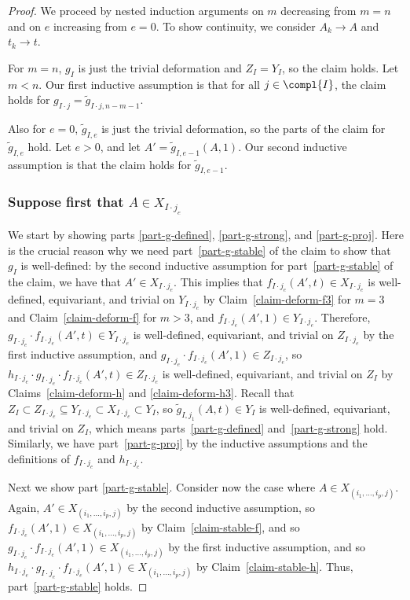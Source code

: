 \begin{proof}
We proceed by nested induction arguments on $m$ decreasing from $m=n$ and on $e$ increasing from $e=0$. To show continuity, we consider $A_k \to A$ and $t_k \to t$.

For $m = n$, $g_I$ is just the trivial deformation and $Z_I = Y_I$, so the claim holds. Let $m < n$. Our first inductive assumption is that for all $j\in \compl{I}$, the claim holds for $g_{I\cdot j} = \tilde g_{I\cdot j,n-m-1}$.

Also for $e=0$, $\tilde g_{I,e}$ is just the trivial deformation, so the parts of the claim for $\tilde g_{I,e}$ hold.
Let $e > 0$, and let $A' = \tilde g_{I,e-1}(A,1)$. Our second inductive assumption is that the claim holds for $\tilde g_{I,e-1}$.

\subsubsection*{Suppose first that $A \in X_{I\cdot j_e}$}

We start by showing parts \eqref{part-g-defined}, \eqref{part-g-strong}, and \eqref{part-g-proj}.
Here is the crucial reason why we need part~\eqref{part-g-stable} of the claim to show that $g_I$ is well-defined: by the second inductive assumption for part~\eqref{part-g-stable} of the claim, we have that $A' \in X_{I\cdot j_e}$. This implies that $f_{I\cdot j_e}(A',t) \in X_{I\cdot j_e}$ is well-defined, equivariant, and trivial on $Y_{I\cdot j_e}$ by Claim~\ref{claim-deform-f3} for $m=3$ and Claim~\ref{claim-deform-f} for $m>3$, and $f_{I\cdot j_e}(A',1) \in Y_{I\cdot j_e}$.
Therefore, $g_{I\cdot j_e} \cdot f_{I\cdot j_e}(A',t) \in Y_{I\cdot j_e}$ is well-defined, equivariant, and trivial on $Z_{I\cdot j_e}$ by the first inductive assumption, and $g_{I\cdot j_e} \cdot f_{I\cdot j_e}(A',1) \in Z_{I\cdot j_e}$, so $h_{I\cdot j_e}\cdot g_{I\cdot j_e}\cdot f_{I\cdot j_e}(A',t) \in Z_{I\cdot j_e}$ is well-defined, equivariant, and trivial on $Z_I$ by Claims~\ref{claim-deform-h} and \ref{claim-deform-h3}.
Recall that $Z_I \subset Z_{I\cdot j_e} \subseteq Y_{I\cdot j_e} \subset X_{I\cdot j_e} \subset Y_I$, so $\tilde g_{I, j_1}({A},t) \in Y_I$ is well-defined, equivariant, and trivial on $Z_I$, which means parts~\eqref{part-g-defined} and~\eqref{part-g-strong} hold.
Similarly, we have part~\eqref{part-g-proj} by the inductive assumptions and the definitions of $f_{I\cdot j_e}$ and $h_{I\cdot j_e}$.

Next we show part \eqref{part-g-stable}.
Consider now the case where $A \in X_{(i_1,\dots,i_{p},j)}$.
Again, $A' \in X_{(i_1,\dots,i_{p},j)}$ by the second inductive assumption, so $f_{I\cdot j_e}(A',1) \in X_{(i_1,\dots,i_{p},j)}$ by Claim~\ref{claim-stable-f}, and so $g_{I\cdot j_e}\cdot f_{I\cdot j_e}(A',1) \in X_{(i_1,\dots,i_{p},j)}$ by the first inductive assumption, and so $h_{I\cdot j_e}\cdot g_{I\cdot j_e}\cdot f_{I\cdot j_e}(A',1) \in X_{(i_1,\dots,i_{p},j)}$ by Claim~\ref{claim-stable-h}.
Thus, part~\eqref{part-g-stable} holds.


\end{proof}
